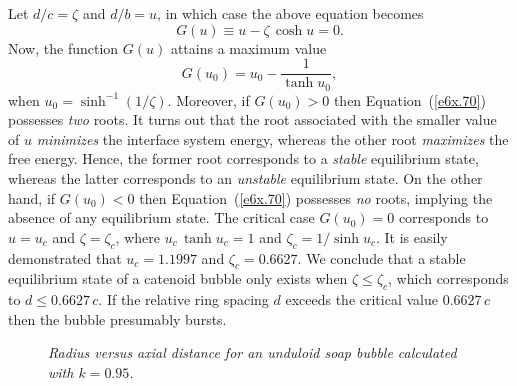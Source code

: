 Let $d/c=\zeta$ and $d/b=u$, in which case the above equation becomes
\begin{equation}\label{e6x.70}
G(u) \equiv u - \zeta\,\cosh u = 0.
\end{equation}
Now, the function $G(u)$ attains a maximum value
\begin{equation}
G(u_0) = u_0-\frac{1}{\tanh u_0},
\end{equation}
when $ u_0= \sinh^{-1}(1/\zeta)$. Moreover, if $G(u_0)>0$ then Equation~(\ref{e6x.70}) possesses {\em two}\/ roots. It turns
out that the root associated with the smaller value of $u$ {\em minimizes}\/ the interface system energy, whereas
the other root {\em maximizes}\/ the free energy. Hence, the former root corresponds to a {\em stable}\/
equilibrium state, whereas the latter  corresponds to an {\em unstable}\/
equilibrium state. On the other hand, if $G(u_0)<0$ then Equation~(\ref{e6x.70}) 
possesses {\em no}\/ roots, implying the absence of any equilibrium state. The critical case $G(u_0)=0$ 
corresponds to $u=u_c$ and $\zeta=\zeta_c$, where $u_c\,\tanh u_c=1$ and $\zeta_c=1/\sinh u_c$. 
It is easily demonstrated that $u_c=1.1997$ and $\zeta_c=0.6627$. 
We conclude that  a stable equilibrium state of a catenoid bubble only exists when $\zeta\leq \zeta_c$, which corresponds to
$d\leq 0.6627\,c$. If the relative ring spacing $d$ exceeds the critical value $0.6627\,c$ then the bubble presumably bursts. 

\begin{figure}
\epsfysize=3.5in
\centerline{}
\caption{\em Radius  versus axial distance for an unduloid soap bubble  calculated with $k=0.95$.}\label{f6x.08}
\end{figure}

